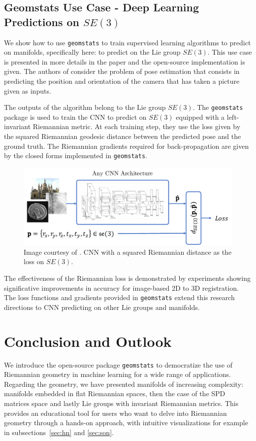 \documentclass{article}
\begin{document}
\subsection{Geomstats Use Case - Deep Learning Predictions on $SE(3)$}\label{sec:pose}

We show how to use \texttt{geomstats} to train supervised learning algorithms to predict on manifolds, specifically here: to predict on the Lie group $SE(3)$. This use case is presented in more details in the paper \cite{Hou2018} and the open-source implementation is given. The authors of \cite{Hou2018} consider the problem of pose estimation that consists in predicting the position and orientation of the camera that has taken a picture given as inputs. 

The outputs of the algorithm belong to the Lie group $SE(3)$. The \texttt{geomstats} package is used to train the CNN to predict on $SE(3)$ equipped with a left-invariant Riemannian metric. At each training step, they use the loss given by the squared Riemannian geodesic distance between the predicted pose and the ground truth. The Riemannian gradients required for back-propagation are given by the closed forms implemented in \texttt{geomstats}.

\begin{figure}[ht]
\centering
\includegraphics[width=0.75\linewidth]{network}
\caption{Image courtesy of \cite{Hou2018}. CNN with a squared Riemannian distance as the loss on $SE(3)$.}
\label{fig:overview}
\end{figure}

The effectiveness of the Riemannian loss is demonstrated by experiments showing significative improvements in accuracy for image-based 2D to 3D registration. The loss functions and gradients provided in \texttt{geomstats} extend this research directions to CNN predicting on other Lie groups and manifolds.

\section{Conclusion and Outlook}

We introduce the open-source package \texttt{geomstats} to democratize the use of Riemannian geometry in machine learning for a wide range of applications. Regarding the geometry, we have presented manifolds of increasing complexity: manifolds embedded in flat Riemannian spaces, then the case of the SPD matrices space and lastly Lie groups with invariant Riemannian metrics. This provides an educational tool for users who want to delve into Riemannian geometry through a hands-on approach, with intuitive visualizations for example in subsections~\ref{sec:hn} and \ref{sec:son}. 
\end{document}
